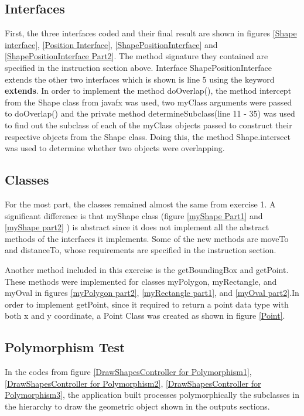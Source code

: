 \documentclass[a4paper,12pt]{article}
\begin{document}
\subsection{Interfaces}
First, the three interfaces coded and their final result are shown in figures \ref{Shape interface}, \ref{Position Interface}, \ref{ShapePositionInterface} and \ref{ShapePositionInterface Part2}. The method signature they contained are specified in the instruction section above. Interface ShapePositionInterface extends the other two interfaces which is shown is line 5 using the keyword \textbf{extends}. In order to implement the method doOverlap(), the method intercept from the Shape class from javafx was used, two myClass arguments were passed to doOverlap() and the private method determineSubclass(line 11 - 35) was used to find out the subclass 
of each of the myClass objects passed to construct their respective objects from the Shape class. Doing this, the method Shape.intersect was used to determine whether two objects were overlapping.

\subsection{Classes}
For the most part, the classes remained almost the same from exercise 1. A significant difference is that myShape class (figure \ref{myShape Part1} and \ref{myShape part2}  ) is abstract since it does not implement all the abstract methods of the interfaces it implements. Some of the new methods are  moveTo  and distanceTo, whose requirements are specified in the instruction section. \newline 

\vspace{0.25cm}
Another method included in this exercise is the getBoundingBox and getPoint. These methods were implemented for classes myPolygon, myRectangle, and myOval in figures \ref{myPolygon part2}, \ref{myRectangle part1}, and \ref{myOval part2}.In order to implement getPoint, since it required to return a point data type with both x and y coordinate, a Point Class was created as shown in figure \ref{Point}.


\subsection{Polymorphism Test}
In the codes from figure \ref{DrawShapesController for Polymorphism1},\ref{DrawShapesController for Polymorphism2}, \ref{DrawShapesController for Polymorphism3}, the application built  processes polymorphically the subclasses in the hierarchy to draw the geometric object shown in the outputs sections. 
\end{document}
